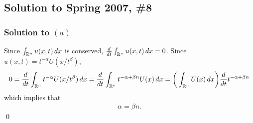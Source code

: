 \subsection*{Solution to Spring 2007, \#8}
\subsubsection*{Solution to $(a)$}
Since $\int_{\mathbb{R}^n}u(x, t)\, dx$ is conserved, $\frac{d}{dt}\int_{\mathbb{R}^{n}}u(x, t)\, dx = 0$. Since $u(x, t) = t^{-\alpha}U(x/t^{\beta})$,
\begin{align*}
0 = \frac{d}{dt}\int_{\mathbb{R}^{n}}t^{-\alpha}U(x/t^{\beta})\, dx = \frac{d}{dt}\int_{\mathbb{R}^{n}}t^{-\alpha + \beta n}U(x)\, dx = \bigg(\int_{\mathbb{R}^{n}}U(x)\, dx\bigg)\frac{d}{dt}t^{-\alpha + \beta n}
\end{align*}
which implies that
\begin{align}\label{s078cond1}
\alpha = \beta n.
\end{align}
\hfill\qed

